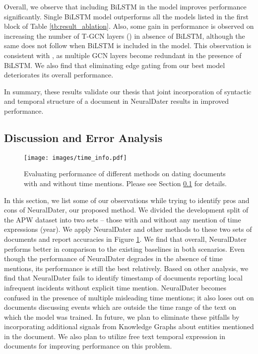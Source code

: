 \documentclass[11pt,a4paper]{article}
\newcommand{\reffig}[1]{Figure \ref{#1}}
\newcommand{\reftbl}[1]{Table \ref{#1}}
\newcommand{\refsec}[1]{Section \ref{#1}}
\newcommand{\method}{NeuralDater}
\begin{document}
Overall, we observe that including BiLSTM in the model improves performance significantly. Single BiLSTM model outperforms all the models listed in the first block of  \reftbl{tb:result_ablation}. Also, some gain in performance is observed on increasing the number of T-GCN layers () in absence of BiLSTM, although the same does not follow when BiLSTM is included in the model. This observation is consistent with \cite{gcn_srl}, as multiple GCN layers become redundant in the presence of BiLSTM. We also find that eliminating edge gating from our best model deteriorates its overall performance.

In summary, these results validate our thesis that joint incorporation of syntactic and temporal structure of a document in \method{} results in improved performance.

\subsection{Discussion and Error Analysis}
\label{sec:discussion}

\begin{figure}[t]
	\centering
	\texttt{[image: images/time\_info.pdf]}
	\caption{\label{fig:results_time_mention}Evaluating performance of different methods on dating  documents with and without time mentions. Please see \refsec{sec:discussion} for details.}
\end{figure}

In this section, we list some of our observations while trying to identify pros and cons of \method{}, our proposed method. We divided the development split of the APW dataset into two sets -- those with and without any mention of time expressions (year). We apply \method{} and other methods to these two sets of documents and report accuracies in \reffig{fig:results_time_mention}. We find that overall, \method{} performs better in comparison to the existing baselines in both scenarios. Even though the performance of \method{} degrades in the absence of time mentions, its performance is still the best relatively. Based on other analysis, we find that \method{} fails to identify timestamp of documents reporting local infrequent incidents without explicit time mention. \method{} becomes confused in the presence of multiple misleading time mentions; it also loses out on documents discussing events which are outside the time range of the text on which the model was trained. In future, we plan to eliminate these pitfalls by incorporating additional signals from Knowledge Graphs about entities mentioned in the document. We also plan to utilize free text temporal expression \cite{temponym_paper} in documents for improving performance on this problem. 
\end{document}
